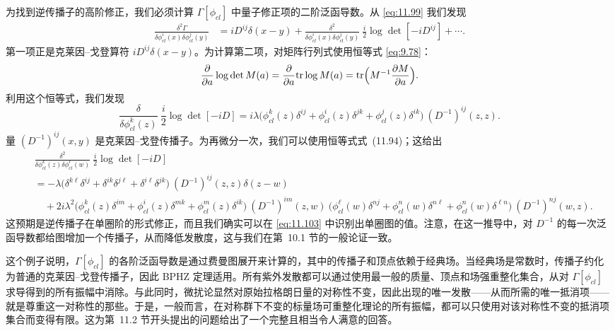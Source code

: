 为找到逆传播子的高阶修正，我们必须计算 $\Gamma[\phi_{cl}]$ 中量子修正项的二阶泛函导数。从 \eqref{eq:11.99} 我们发现
\begin{equation}
  \begin{aligned}
    \frac{\delta^2\Gamma}{\delta\phi^i_{cl}(x)\delta\phi^j_{cl}(y)}
    &= iD^{ij}\delta(x-y) + \frac{\delta^2}{\delta\phi^i_{cl}(x)
      \delta\phi^j_{cl}(y)}\ \frac{i}{2}\log\det[-iD^{ij}] + \cdots .
  \end{aligned}
\end{equation}
第一项正是克莱因--戈登算符 $iD^{ij}\delta(x-y)$。为计算第二项，对矩阵行列式使用恒等式 \eqref{eq:9.78}：
\begin{equation}
  \frac{\partial}{\partial a}\log\det M(a) = \frac{\partial}{\partial a}
    \mathrm{tr}\log M(a) = \mathrm{tr}\Bigl( M^{-1}\frac{\partial M}
      {\partial a} \Bigr) .
  \label{eq:11.101}
\end{equation}
利用这个恒等式，我们发现
\begin{equation}
  \frac{\delta}{\delta\phi^k_{cl}(z)}\ \frac{i}{2}\log\det[-iD]
  = i\lambda\bigl( \phi^k_{cl}(z)\delta^{ij} + \phi^i_{cl}(z)\delta^{jk}
    + \phi^j_{cl}(z)\delta^{ik} \bigr)\ (D^{-1})^{ij}(z,z) .
  \label{eq:11.102}
\end{equation}
量 $(D^{-1})^{ij}(x,y)$ 是克莱因--戈登传播子。为再微分一次，我们可以使用恒等式式~(11.94)；这给出
\begin{equation}
  \begin{aligned}
    &\frac{\delta^2}{\delta\phi^k_{cl}(z)\delta\phi^\ell_{cl}(w)}\
    \frac{i}{2}\log\det[-iD]\\
    &= -\lambda\bigl( \delta^{k\ell}\delta^{ij} + \delta^{ik}\delta^{j\ell}
      + \delta^{i\ell}\delta^{jk} \bigr)\ (D^{-1})^{ij}(z,z)\delta(z-w)\\
    &\quad + 2i\lambda^2\bigl( \phi^k_{cl}(z)\delta^{im} + \phi^i_{cl}(z)
      \delta^{mk} + \phi^m_{cl}(z)\delta^{ik} \bigr)\ (D^{-1})^{im}(z,w)\
      \bigl( \phi^\ell_{cl}(w)\delta^{nj} + \phi^n_{cl}(w)\delta^{n\ell}
        + \phi^{n}_{cl}(w)\delta^{\ell n} \bigr)\ (D^{-1})^{nj}(w,z) .
  \end{aligned}
  \label{eq:11.103}
\end{equation}
这预期是逆传播子在单圈阶的形式修正，而且我们确实可以在 \eqref{eq:11.103} 中识别出单圈图的值。注意，在这一推导中，对 $D^{-1}$ 的每一次泛函导数都给图增加一个传播子，从而降低发散度，这与我们在第~10.1 节的一般论证一致。

这个例子说明，$\Gamma[\phi_{cl}]$ 的各阶泛函导数是通过费曼图展开来计算的，其中的传播子和顶点依赖于经典场。当经典场是常数时，传播子约化为普通的克莱因--戈登传播子，因此 BPHZ 定理适用。所有紫外发散都可以通过使用最一般的质量、顶点和场强重整化集合，从对 $\Gamma[\phi_{cl}]$ 求导得到的所有振幅中消除。与此同时，微扰论显然对原始拉格朗日量的对称性不变，因此出现的唯一发散——从而所需的唯一抵消项——就是尊重这一对称性的那些。于是，一般而言，在对称群下不变的标量场可重整化理论的所有振幅，都可以只使用对该对称性不变的抵消项集合而变得有限。这为第~11.2 节开头提出的问题给出了一个完整且相当令人满意的回答。

